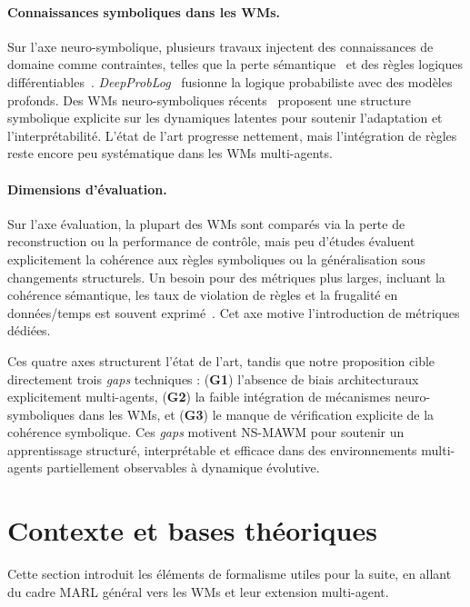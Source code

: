 \documentclass[final]{jfsma}
\theoremstyle{plain}
\theoremstyle{definition}
\theoremstyle{remark}
\begin{document}
\paragraph{Connaissances symboliques dans les WMs.} Sur l'axe neuro-symbolique, plusieurs travaux injectent des connaissances de domaine comme contraintes, telles que la perte sémantique~\cite{Xu2018semanticloss} et des règles logiques différentiables~\cite{Fan2017differentiablelearninglogicalrules}. \emph{DeepProbLog}~\cite{manhaeve2018deepproblog} fusionne la logique probabiliste avec des modèles profonds. Des WMs neuro-symboliques récents~\cite{balloch2023neurosymbolicworldmodelsadapting, agravante-etal-2023-learning} proposent une structure symbolique explicite sur les dynamiques latentes pour soutenir l'adaptation et l'interprétabilité. L'état de l'art progresse nettement, mais l'intégration de règles reste encore peu systématique dans les WMs multi-agents.

\paragraph{Dimensions d'évaluation.} Sur l'axe évaluation, la plupart des WMs sont comparés via la perte de reconstruction ou la performance de contrôle, mais peu d'études évaluent explicitement la cohérence aux règles symboliques ou la généralisation sous changements structurels. Un besoin pour des métriques plus larges, incluant la cohérence sémantique, les taux de violation de règles et la frugalité en données/temps est souvent exprimé~\cite{Wong2023}. Cet axe motive l'introduction de métriques dédiées.

Ces quatre axes structurent l'état de l'art, tandis que notre proposition cible directement trois \emph{gaps} techniques : (\textbf{G1}) l'absence de biais architecturaux explicitement multi-agents, (\textbf{G2}) la faible intégration de mécanismes neuro-symboliques dans les WMs, et (\textbf{G3}) le manque de vérification explicite de la cohérence symbolique. Ces \emph{gaps} motivent NS-MAWM pour soutenir un apprentissage structuré, interprétable et efficace dans des environnements multi-agents partiellement observables à dynamique évolutive.


\section{Contexte et bases théoriques}
\label{sec:background}

Cette section introduit les éléments de formalisme utiles pour la suite, en allant du cadre MARL général vers les WMs et leur extension multi-agent.
\end{document}
